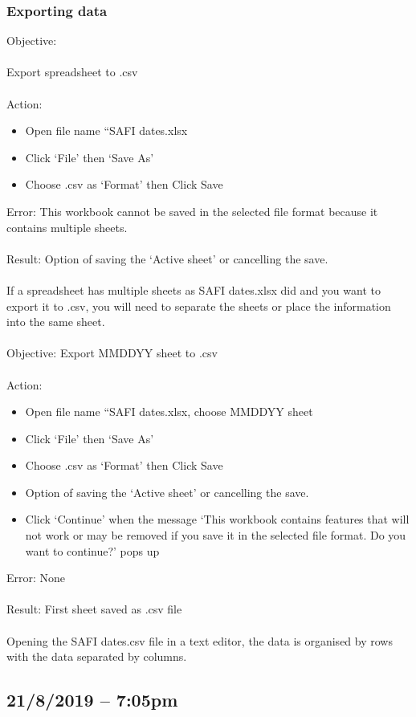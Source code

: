 \documentclass{article}
\begin{document}
\subsubsection*{Exporting data}
Objective:\\\\
Export spreadsheet to .csv\\\\
Action:
\begin{itemize}
\item Open file name “SAFI dates.xlsx
\item Click ‘File’ then ‘Save As’
\item Choose .csv as ‘Format’ then Click Save
\end{itemize}
Error: This workbook cannot be saved in the selected file format because it contains multiple sheets.\label{error:CSV export}\\\\
Result: Option of saving the ‘Active sheet’ or cancelling the save.\\\\
If a spreadsheet has multiple sheets as SAFI dates.xlsx did and you want to export it to .csv, you will need to separate the sheets or place the information into the same sheet.\\\\
Objective: Export MMDDYY sheet to .csv\\\\
Action:
\begin{itemize}
\item Open file name “SAFI dates.xlsx, choose MMDDYY sheet
\item Click ‘File’ then ‘Save As’
\item Choose .csv as ‘Format’ then Click Save
\item Option of saving the ‘Active sheet’ or cancelling the save.
\item Click ‘Continue’ when the message ‘This workbook contains features that will not work or may be removed if you save it in the selected file format. Do you want to continue?’ pops up
\end{itemize}
Error: None\\\\
Result: First sheet saved as .csv file\\\\
Opening the SAFI dates.csv file in a text editor, the data is organised by rows with the data separated by columns.
\subsection*{21/8/2019 – 7:05pm}
\end{document}
